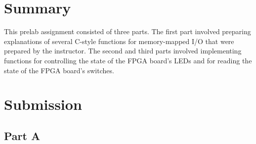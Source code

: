 \documentclass[11pt, letterpaper]{article} %
\begin{document}
\makelabtitle
  
\section*{Summary}

This prelab assignment consisted of three parts. The first part involved preparing explanations of several C-style functions for memory-mapped I/O that were prepared by the instructor. The second and third parts involved implementing functions for controlling the state of the FPGA board's LEDs and for reading the state of the FPGA board's switches. 

\section*{Submission}

\subsection*{Part A}
\end{document}
